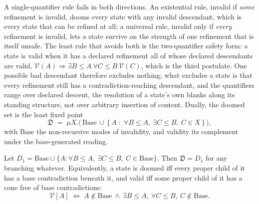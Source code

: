 A single-quantifier rule fails in both directions. An existential rule, invalid if \emph{some} refinement is invalid, dooms every state with any invalid descendant, which is every state that can be refined at all; a universal rule, invalid only if \emph{every} refinement is invalid, lets a state survive on the strength of one refinement that is itself unsafe. The least rule that avoids both is the two-quantifier safety form: a state is valid when it has a declared refinement all of whose declared descendants are valid, $\mathcal{V}(A) \Rightarrow \exists B \le A\ \forall C \le B\ \mathcal{V}(C)$, which is the third postulate. One possible bad descendant therefore excludes nothing; what excludes a state is that every refinement still has a contradiction-reaching descendant, and the quantifiers range over declared descent, the resolution of a state's own blanks along its standing structure, not over arbitrary insertion of content. Dually, the doomed set is the least fixed point
\begin{equation}\label{eq:mu}
\mathfrak{D} \;=\; \mu X.\big(\, \mathrm{Base} \,\cup\, \{\, A \;:\; \forall B \le A,\ \exists C \le B,\ C \in X \,\}\,\big),
\end{equation}
with $\mathrm{Base}$ the non-recursive modes of invalidity, and validity its complement under the base-generated reading.

\begin{proposition}
\label{prop:closes}
Let $D_1 = \mathrm{Base} \cup \{A : \forall B \le A,\ \exists C \le B,\ C \in \mathrm{Base}\}$. Then $\mathfrak{D} = D_1$ for any branching whatever. Equivalently, a state is doomed iff every proper child of it has a base contradiction beneath it, and valid iff some proper child of it has a cone free of base contradictions:
\begin{equation}\label{eq:direct}
\mathcal{V}[A] \;\iff\; A \notin \mathrm{Base} \ \wedge\ \exists B \le A,\ \forall C \le B,\ C \notin \mathrm{Base}.
\end{equation}
\end{proposition}





